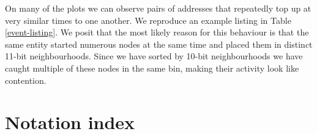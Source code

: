 %
On many of the plots we can observe pairs of addresses that repeatedly top up at very similar times to one another.
%
We reproduce an example listing in Table \ref{event-listing}.
%
We posit that the most likely reason for this behaviour is that the same entity started numerous nodes at the same time and placed them in distinct 11-bit neighbourhoods.
%
Since we have sorted by 10-bit neighbourhoods we have caught multiple of these nodes in the same bin, making their activity look like contention.



\appendix
\section{Notation index}


